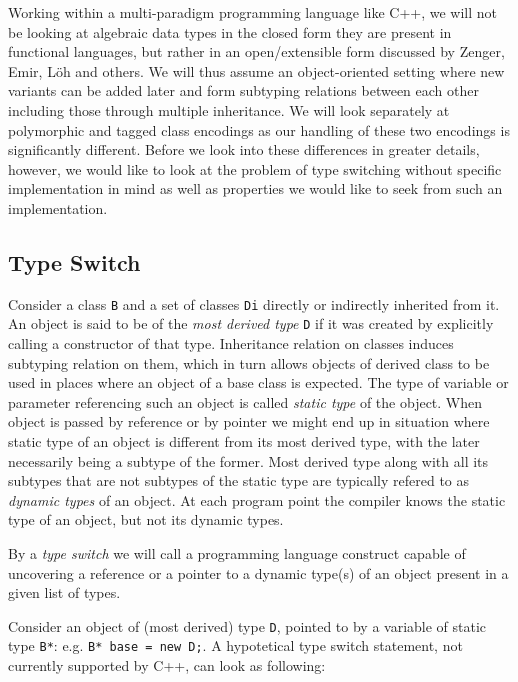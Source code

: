 \documentclass[preprint]{sigplanconf}
\makeatletter
\DeclareRobustCommand{\code}[1]{{\lstinline[breaklines=false,escapechar=@]{#1}}}
\makeatother
\begin{document}
Working within a multi-paradigm programming language like C++, we will not be 
looking at algebraic data types in the closed form they are present in 
functional languages, but rather in an open/extensible form discussed by 
Zenger\cite{Zenger:2001}, Emir\cite{EmirThesis}, L\"oh\cite{LohHinze2006} and others. We will thus 
assume an object-oriented setting where new variants can be added later and form
subtyping relations between each other including those through multiple 
inheritance. We will look separately at polymorphic and tagged class encodings 
as our handling of these two encodings is significantly different. Before we 
look into these differences in greater details, however, we would like to look 
at the problem of type switching without specific implementation in mind as well 
as properties we would like to seek from such an implementation.

\subsection{Type Switch}

Consider a class \code{B} and a set of classes \code{Di} directly or indirectly 
inherited from it. An object is said to be of the \emph{most derived type} 
\code{D} if it was created by explicitly calling a constructor of that type.
Inheritance relation on classes induces subtyping relation on them, which in 
turn allows objects of derived class to be used in places where an object of a 
base class is expected. The type of variable or parameter referencing such an
object is called \emph{static type} of the object. When object is passed by 
reference or by pointer we might end up in situation where static type of an 
object is different from its most derived type, with the later necessarily 
being a subtype of the former. Most derived type along with all its subtypes 
that are not subtypes of the static type are typically refered to as 
\emph{dynamic types} of an object. At each program point the compiler knows the 
static type of an object, but not its dynamic types.

By a \emph{type switch} we will call a programming language construct capable of 
uncovering a reference or a pointer to a dynamic type(s) of an object present in 
a given list of types.

Consider an object of (most derived) type \code{D}, pointed to by a variable of 
static type \code{B*}: e.g. \code{B* base = new D;}. A hypotetical type switch 
statement, not currently supported by C++, can look as following:
\end{document}

